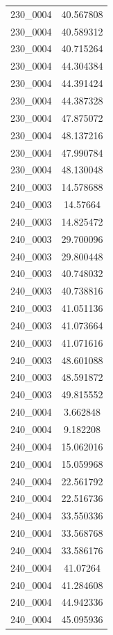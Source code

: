\begin{table}[H]
\begin{tabular}{|c|c|}
        230\_0004 & 40.567808 \\
        230\_0004 & 40.589312 \\
        230\_0004 & 40.715264 \\
        230\_0004 & 44.304384 \\
        230\_0004 & 44.391424 \\
        230\_0004 & 44.387328 \\
        230\_0004 & 47.875072 \\
        230\_0004 & 48.137216 \\
        230\_0004 & 47.990784 \\
        230\_0004 & 48.130048 \\
        240\_0003 & 14.578688 \\
        240\_0003 & 14.57664 \\
        240\_0003 & 14.825472 \\
        240\_0003 & 29.700096 \\
        240\_0003 & 29.800448 \\
        240\_0003 & 40.748032 \\
        240\_0003 & 40.738816 \\
        240\_0003 & 41.051136 \\
        240\_0003 & 41.073664 \\
        240\_0003 & 41.071616 \\
        240\_0003 & 48.601088 \\
        240\_0003 & 48.591872 \\
        240\_0003 & 49.815552 \\
        240\_0004 & 3.662848 \\
        240\_0004 & 9.182208 \\
        240\_0004 & 15.062016 \\
        240\_0004 & 15.059968 \\
        240\_0004 & 22.561792 \\
        240\_0004 & 22.516736 \\
        240\_0004 & 33.550336 \\
        240\_0004 & 33.568768 \\
        240\_0004 & 33.586176 \\
        240\_0004 & 41.07264 \\
        240\_0004 & 41.284608 \\
        240\_0004 & 44.942336 \\
        240\_0004 & 45.095936 \\

\end{tabular}
\end{table}
